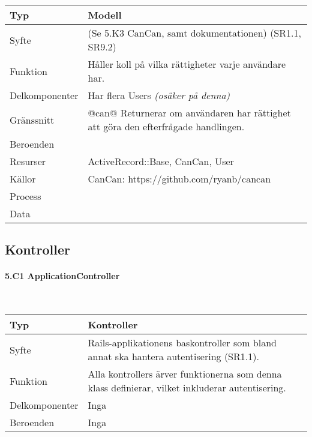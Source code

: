 \documentclass[a4paper, twoside, 11pt, titlepage]{article}
\begin{document}
			\begin {table} [ht] \begin{tabular} {  p{3.5cm} p{9.6cm} }
				\hline
				Typ & Modell  \\
				\hline
				Syfte & (Se 5.K3 CanCan, samt dokumentationen) (SR1.1, SR9.2)  \\
				\hline
				Funktion & Håller koll på vilka rättigheter varje användare har.  \\
				\hline
				Delkomponenter & Har flera Users \emph{(osäker på denna)}  \\
				\hline
				Gränssnitt & @can@ Returnerar om användaren har rättighet att göra den efterfrågade handlingen.  \\
				\hline
				Beroenden &   \\
				\hline
				Resurser & ActiveRecord::Base, CanCan, User  \\
				\hline
				Källor & CanCan: https://github.com/ryanb/cancan  \\
				\hline
				Process &   \\
				\hline
				Data &   \\
				\hline
			\end{tabular} \end{table} \FloatBarrier


	\subsection{Kontroller}



			\paragraph{5.C1 ApplicationController}\

			\begin {table} [ht] \begin{tabular} {  p{3.5cm} p{9.6cm} }
				\hline
				Typ & Kontroller  \\
				\hline
				Syfte & Rails-applikationens baskontroller som bland annat ska hantera autentisering (SR1.1).  \\
				\hline
				Funktion & Alla kontrollers ärver funktionerna som denna klass definierar, vilket inkluderar autentisering.  \\
				\hline
				Delkomponenter & Inga  \\
				\hline
				Beroenden & Inga  \\
				\hline
			\end{tabular} \end{table} \FloatBarrier
			\vspace{6mm}
\end{document}

